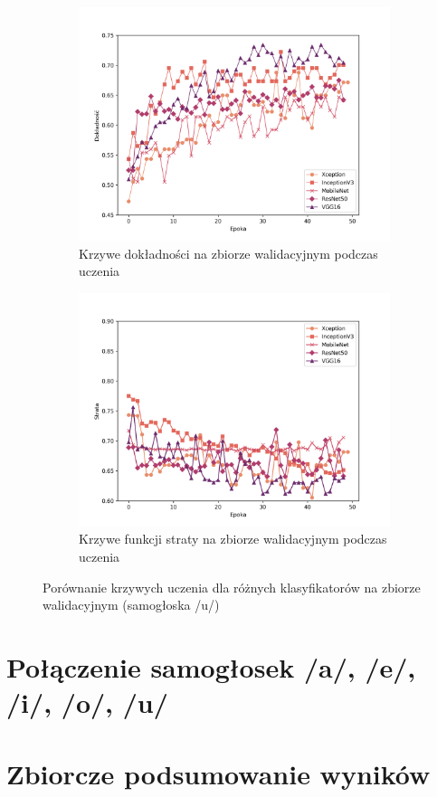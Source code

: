 \begin{figure}[ht]
    \centering
    \begin{subfigure}{0.49\textwidth}
        \centering
        \includegraphics[width=\textwidth]{./img/results/u_acc}
        \caption{Krzywe dokładności na zbiorze walidacyjnym podczas uczenia\@}
        \label{fig:u_acc}
    \end{subfigure}
    \begin{subfigure}{0.49\textwidth}
        \centering
        \includegraphics[width=\textwidth]{./img/results/u_loss}
        \caption{Krzywe funkcji straty na zbiorze walidacyjnym podczas uczenia\@}
        \label{fig:u_loss}
    \end{subfigure}

    \caption{Porównanie krzywych uczenia dla różnych klasyfikatorów na zbiorze walidacyjnym (samogłoska /u/)}
    \label{fig:u_results}
\end{figure}
\section{Połączenie samogłosek /a/, /e/, /i/, /o/, /u/}
\label{sec:samogloski}


\section{Zbiorcze podsumowanie wyników}
\label{sec:podsumowanie-wynikow}